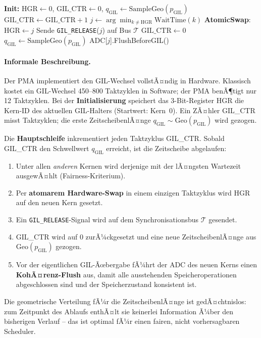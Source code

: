 ﻿\documentclass[a4paper,12pt]{scrreprt}
\theoremstyle{definition}
\begin{document}
	\begin{algorithm}[H]
		\caption{Python Memory Accelerator (PMA) -- GIL-Scheduling}
		\label{alg:pma_gil}
		\begin{algorithmic}[1]
			\State \textbf{Init:} $\mathrm{HGR} \gets 0$, $\mathrm{GIL\_CTR} \gets 0$,
			$q_{\mathrm{GIL}} \gets \mathrm{SampleGeo}(p_{\mathrm{GIL}})$
			\Repeat
			\State $\mathrm{GIL\_CTR} \gets \mathrm{GIL\_CTR} + 1$
			\State $j \gets \arg\min_{k \ne \mathrm{HGR}} \mathrm{WaitTime}(k)$
			\State \textbf{AtomicSwap}: $\mathrm{HGR} \gets j$
			\State Sende \texttt{GIL\_RELEASE}($j$) auf Bus $\mathcal{T}$
			\State $\mathrm{GIL\_CTR} \gets 0$
			\State $q_{\mathrm{GIL}} \gets \mathrm{SampleGeo}(p_{\mathrm{GIL}})$
			\State ADC[$j$].FlushBeforeGIL() 
			\EndIf
		\end{algorithmic}
	\end{algorithm}

	\paragraph{Informale Beschreibung.}
	Der PMA implementiert den GIL-Wechsel vollstÃ¤ndig in Hardware.
	Klassisch kostet ein GIL-Wechsel 450--800 Taktzyklen in Software; der PMA benÃ¶tigt nur 12 Taktzyklen.
	Bei der \textbf{Initialisierung} speichert das 3-Bit-Register HGR die Kern-ID des aktuellen GIL-Halters
	(Startwert: Kern~0). Ein ZÃ¤hler GIL\_CTR misst Taktzyklen; die erste ZeitscheibenlÃ¤nge
	$q_{\mathrm{GIL}} \sim \mathrm{Geo}(p_{\mathrm{GIL}})$ wird gezogen.

	Die \textbf{Hauptschleife} inkrementiert jeden Taktzyklus GIL\_CTR.
	Sobald GIL\_CTR den Schwellwert $q_{\mathrm{GIL}}$ erreicht, ist die Zeitscheibe abgelaufen:
	\begin{enumerate}[noitemsep]
		\item Unter allen \emph{anderen} Kernen wird derjenige mit der lÃ¤ngsten Wartezeit ausgewÃ¤hlt
			(Fairness-Kriterium).
		\item Per \textbf{atomarem Hardware-Swap} in einem einzigen Taktzyklus wird HGR auf den neuen Kern
			gesetzt.
		\item Ein \texttt{GIL\_RELEASE}-Signal wird auf dem Synchronisationsbus $\mathcal{T}$ gesendet.
		\item GIL\_CTR wird auf 0 zurÃ¼ckgesetzt und eine neue ZeitscheibenlÃ¤nge aus $\mathrm{Geo}(p_{\mathrm{GIL}})$
			gezogen.
		\item Vor der eigentlichen GIL-Ãœbergabe fÃ¼hrt der ADC des neuen Kerns einen \textbf{KohÃ¤renz-Flush}
			aus, damit alle ausstehenden Speicheroperationen abgeschlossen sind und der Speicherzustand
			konsistent ist.
	\end{enumerate}
	Die geometrische Verteilung fÃ¼r die ZeitscheibenlÃ¤nge ist gedÃ¤chtnislos: zum Zeitpunkt des Ablaufs
	enthÃ¤lt sie keinerlei Information Ã¼ber den bisherigen Verlauf -- das ist optimal fÃ¼r einen fairen,
	nicht vorhersagbaren Scheduler.
\end{document}
